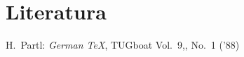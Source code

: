 \section{Literatura}

  \begin{thebibliography}{99}
     H.~Partl: \emph{German \TeX}, TUGboat Vol.~9,, No.~1 ('88)
  \end{thebibliography}